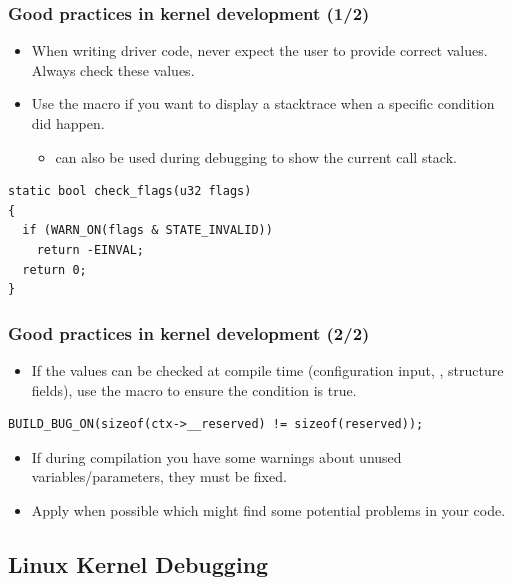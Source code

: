 \begin{frame}[fragile]
  \frametitle{Good practices in kernel development (1/2)}
  \begin{itemize}
    \item When writing driver code, never expect the user to provide correct
          values. Always check these values.
    \item Use the  macro if you want to display a stacktrace when
      a specific condition did happen.
    \begin{itemize}
      \item {} can also be used during debugging to
        show the current call stack.
    \end{itemize}
  \end{itemize}
  \begin{block}{}
    \begin{verbatim}
static bool check_flags(u32 flags)
{
  if (WARN_ON(flags & STATE_INVALID))
    return -EINVAL;
  return 0;
}
    \end{verbatim}
  \end{block}
\end{frame}

\begin{frame}[fragile]
  \frametitle{Good practices in kernel development (2/2)}
  \begin{itemize}
    \item If the values can be checked at compile time (configuration input,
	    , structure fields), use the  macro to
          ensure the condition is true.
  \end{itemize}
  \begin{block}{}
    \begin{verbatim}
BUILD_BUG_ON(sizeof(ctx->__reserved) != sizeof(reserved));
    \end{verbatim}
  \end{block}
  \begin{itemize}
    \item If during compilation you have some warnings about unused
          variables/parameters, they must be fixed.
    \item Apply  when possible which might find some
          potential problems in your code.
  \end{itemize}
\end{frame}

\subsection{Linux Kernel Debugging}

